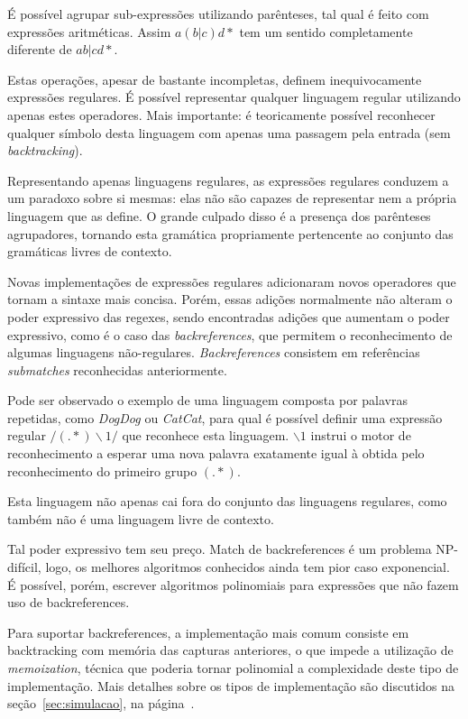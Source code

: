 \documentclass[a4paper,12pt,oneside,onecolumn]{uerj}
\begin{document}
É possível agrupar sub-expressões utilizando parênteses, tal qual é feito com expressões aritméticas. Assim $a(b|c)d*$ tem um sentido completamente diferente de $ab|cd*$.

Estas operações, apesar de bastante incompletas, definem inequivocamente expressões regulares. É possível representar qualquer linguagem regular utilizando apenas estes operadores. Mais importante: é teoricamente possível reconhecer qualquer símbolo desta linguagem com apenas uma passagem pela entrada (sem \emph{backtracking}). 

Representando apenas linguagens regulares, as expressões regulares conduzem a um paradoxo sobre si mesmas: elas não são capazes de representar nem a própria linguagem que as define. O grande culpado disso é a presença dos parênteses agrupadores, tornando esta gramática propriamente pertencente ao conjunto das gramáticas livres de contexto.

Novas implementações de expressões regulares adicionaram novos operadores que tornam a sintaxe mais concisa. Porém, essas adições normalmente não alteram o poder expressivo das regexes, sendo encontradas adições que aumentam o poder expressivo, como é o caso das \emph{backreferences}, que permitem o reconhecimento de algumas linguagens não-regulares. \emph{Backreferences} consistem em referências \emph{submatches} reconhecidas anteriormente.

Pode ser observado o exemplo de uma linguagem composta por palavras repetidas, como \emph{DogDog} ou \emph{CatCat}, para qual é possível definir uma expressão regular $/(.*)\backslash 1/$ que reconhece esta linguagem. $\backslash 1$ instrui o motor de reconhecimento a esperar uma nova palavra exatamente igual à obtida pelo reconhecimento do primeiro grupo $(.*)$.

Esta linguagem não apenas cai fora do conjunto das linguagens regulares, como também não é uma linguagem livre de contexto.

Tal poder expressivo tem seu preço. Match de backreferences é um problema NP-difícil, logo, os melhores algoritmos conhecidos ainda tem pior caso exponencial. É possível, porém, escrever algoritmos polinomiais para expressões que não fazem uso de backreferences.

Para suportar backreferences, a implementação mais comum consiste em backtracking com memória das capturas anteriores, o que impede a utilização de \emph{memoization}, técnica que poderia tornar polinomial a complexidade deste tipo de implementação. Mais detalhes sobre os tipos de implementação são discutidos na seção~\ref{sec:simulacao}, na página~\pageref{sec:simulacao}.
\end{document}
